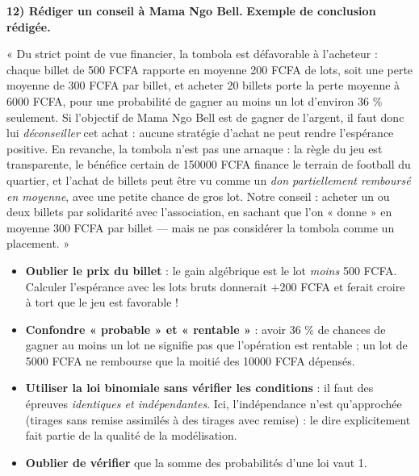 \documentclass[11pt]{article}
\begin{document}
\begin{exoresolu}
\textbf{12) Rédiger un conseil à Mama Ngo Bell.}
\tcblower
\textbf{Exemple de conclusion rédigée.}

« Du strict point de vue financier, la tombola est défavorable à l'acheteur : chaque billet de 500 FCFA rapporte en moyenne 200 FCFA de lots, soit une perte moyenne de 300 FCFA par billet, et acheter 20 billets porte la perte moyenne à \num{6000} FCFA, pour une probabilité de gagner au moins un lot d'environ 36 \% seulement. Si l'objectif de Mama Ngo Bell est de gagner de l'argent, il faut donc lui \emph{déconseiller} cet achat : aucune stratégie d'achat ne peut rendre l'espérance positive. En revanche, la tombola n'est pas une arnaque : la règle du jeu est transparente, le bénéfice certain de \num{150000} FCFA finance le terrain de football du quartier, et l'achat de billets peut être vu comme un \emph{don partiellement remboursé en moyenne}, avec une petite chance de gros lot. Notre conseil : acheter un ou deux billets par solidarité avec l'association, en sachant que l'on « donne » en moyenne 300 FCFA par billet — mais ne pas considérer la tombola comme un placement. »
\end{exoresolu}

\begin{attention}
\begin{itemize}
\item \textbf{Oublier le prix du billet} : le gain algébrique est le lot \emph{moins} 500 FCFA. Calculer l'espérance avec les lots bruts donnerait $+200$ FCFA et ferait croire à tort que le jeu est favorable !
\item \textbf{Confondre « probable » et « rentable »} : avoir 36 \% de chances de gagner au moins un lot ne signifie pas que l'opération est rentable ; un lot de \num{5000} FCFA ne rembourse que la moitié des \num{10000} FCFA dépensés.
\item \textbf{Utiliser la loi binomiale sans vérifier les conditions} : il faut des épreuves \emph{identiques et indépendantes}. Ici, l'indépendance n'est qu'approchée (tirages sans remise assimilés à des tirages avec remise) : le dire explicitement fait partie de la qualité de la modélisation.
\item \textbf{Oublier de vérifier} que la somme des probabilités d'une loi vaut 1.
\end{itemize}
\end{attention}
\end{document}
